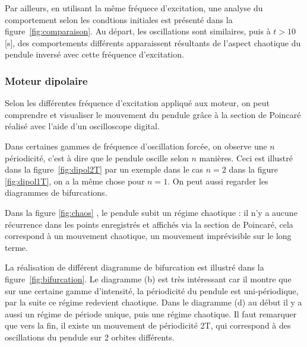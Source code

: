 \documentclass[a4paper,12pt,oneside]{article}
\begin{document}
Par ailleurs, en utilisant la même fréquece d'excitation, une analyse du comportement selon les condtions initiales est présenté dans la figure~\ref{fig:comparaison}. Au départ, les oscillations sont similaires, puis à $t>10$ [s], des comportements différents apparaissent résultants de l'aspect chaotique du pendule inversé avec cette fréquence d'excitation. 





\subsubsection{Moteur dipolaire}

Selon les différentes fréquence d'excitation appliqué aux moteur, on peut comprendre et visualiser le mouvement du pendule grâce à la section de Poincaré réalisé avec l'aide d'un oscilloscope digital.

Dans certaines gammes de fréquence d'oscillation forcée, on observe une $n$ périodicité, c'est à dire que le pendule oscille selon $n$ manières.%
 Ceci est illustré dans la figure~\ref{fig:dipol2T} par un exemple dans le cas $n=2$ dans la figure \ref{fig:dipol1T}, on a la même chose pour $n=1$. On peut aussi regarder les diagrammes de bifurcations.

Dans la figure \ref{fig:chaos} , le pendule subit un régime chaotique : il n'y a aucune récurrence dans les points enregistrés et affichés via la section de Poincaré, cela correspond à un mouvement chaotique, un mouvement imprévisible sur le long terme.

La réalisation de différent diagramme de bifurcation est illustré dans la figure~\ref{fig:bifurcation}. Le diagramme (b) est très intéressant car il montre que sur une certaine gamme d'intensité, la périodicité du pendule est uni-périodique, par la suite ce régime redevient chaotique.
Dans le diagramme (d) au début il y a aussi un régime de période unique, puis une régime chaotique. Il faut remarquer que vers la fin, il existe un mouvement de périodicité 2T, qui correspond à des oscillations du pendule sur 2 orbites différents.





\end{document}
